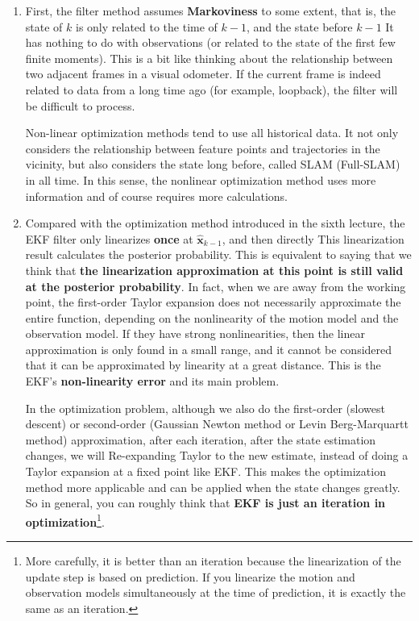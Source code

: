 \begin{enumerate}
\item First, the filter method assumes \textbf{Markoviness} to some extent, that is, the state of $k$ is only related to the time of $k-1$, and the state before $k-1$ It has nothing to do with observations (or related to the state of the first few finite moments). This is a bit like thinking about the relationship between two adjacent frames in a visual odometer. If the current frame is indeed related to data from a long time ago (for example, loopback), the filter will be difficult to process.

Non-linear optimization methods tend to use all historical data. It not only considers the relationship between feature points and trajectories in the vicinity, but also considers the state long before, called SLAM (Full-SLAM) in all time. In this sense, the nonlinear optimization method uses more information and of course requires more calculations.

\item Compared with the optimization method introduced in the sixth lecture, the EKF filter only linearizes \textbf{once} at $\bm{\hat{x}}_{k-1}$, and then directly This linearization result calculates the posterior probability. This is equivalent to saying that we think that \textbf{the linearization approximation at this point is still valid at the posterior probability}. In fact, when we are away from the working point, the first-order Taylor expansion does not necessarily approximate the entire function, depending on the nonlinearity of the motion model and the observation model. If they have strong nonlinearities, then the linear approximation is only found in a small range, and it cannot be considered that it can be approximated by linearity at a great distance. This is the EKF's \textbf{non-linearity error} and its main problem.

In the optimization problem, although we also do the first-order (slowest descent) or second-order (Gaussian Newton method or Levin Berg-Marquartt method) approximation, after each iteration, after the state estimation changes, we will Re-expanding Taylor to the new estimate, instead of doing a Taylor expansion at a fixed point like EKF. This makes the optimization method more applicable and can be applied when the state changes greatly. So in general, you can roughly think that \textbf{EKF is just an iteration in optimization}\footnote{More carefully, it is better than an iteration because the linearization of the update step is based on prediction. If you linearize the motion and observation models simultaneously at the time of prediction, it is exactly the same as an iteration. }.


\end{enumerate}
